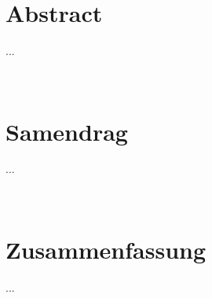 
\chapter*{Abstract}


...

~\\ \dckeywordsen


\chapter*{Samendrag}


...

~\\ \dckeywordsno


\chapter*{Zusammenfassung}


...

~\\ \dckeywordsde

